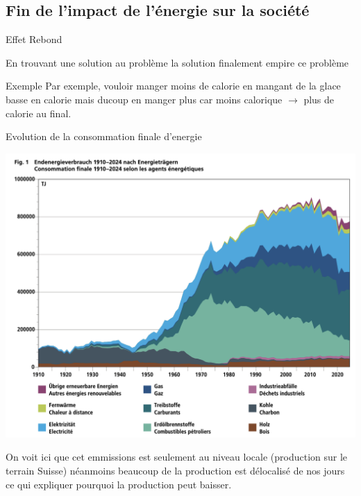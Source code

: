 \subsection{Fin de l'impact de l'énergie sur la société}

\begin{parag}{Effet Rebond}
    \begin{definition}
        En trouvant une solution au problème la solution finalement empire ce problème
    \end{definition}
    \begin{subparag}{Exemple}
        Par exemple, vouloir manger moins de calorie en mangant de la glace basse en calorie mais ducoup en manger plus car moins calorique $\to$ plus de calorie au final.
    \end{subparag}
\end{parag}
\begin{parag}{Evolution de la consommation finale d'energie}
	\begin{center}
    \includegraphics[scale=0.2]{12025-09-23.png}
	\end{center}
	
    On voit ici que cet emmissions est seulement au niveau locale (production sur le terrain Suisse) néanmoins beaucoup de la production est délocalisé de nos jours ce qui expliquer pourquoi la production peut baisser.
\end{parag}
